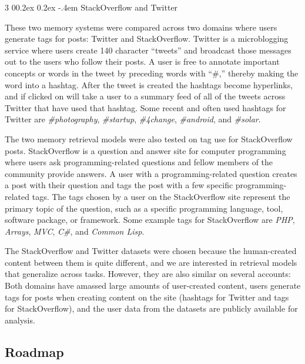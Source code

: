 \documentclass[man,donotrepeattitle]{apa6}
\makeatletter
\renewcommand{\subsubsection}{%
  \@startsection
  {subsubsection}%
  {3}%
  {\parindent}%
  {0\baselineskip \@plus 0.2ex \@minus 0.2ex}%
  {-.4em}%
  {\normalfont\normalsize\bfseries\addperi}}
\makeatother
\begin{document}
\subsubsection{StackOverflow and Twitter}

These two memory systems were compared across two domains where users generate tags for posts: Twitter and StackOverflow.
Twitter is a microblogging service where users create 140 character ``tweets'' and broadcast those messages out to the users who follow their posts.
A user is free to annotate important concepts or words in the tweet by preceding words with ``\#,'' thereby making the word into a hashtag.
After the tweet is created the hashtags become hyperlinks, and if clicked on will take a user to a summary feed of all of the tweets across Twitter that have used that hashtag.
Some recent and often used hashtags for Twitter are \emph{\#photography}, \emph{\#startup}, \emph{\#4change}, \emph{\#android}, and \emph{\#solar}.

The two memory retrieval models were also tested on tag use for StackOverflow posts.
StackOverflow is a question and answer site for computer programming where users ask programming-related questions and fellow members of the community provide answers.
A user with a programming-related question creates a post with their question and tags the post with a few specific programming-related tags. 
The tags chosen by a user on the StackOverflow site represent the primary topic of the question, such as a specific programming language, tool, software package, or framework.
Some example tags for StackOverflow are \emph{PHP}, \emph{Arrays}, \emph{MVC}, \emph{C\#}, and \emph{Common Lisp}.

The StackOverflow and Twitter datasets were chosen because the human-created content between them is quite different, and we are interested in retrieval models that generalize across tasks.
However, they are also similar on several accounts:
Both domains have amassed large amounts of user-created content, users generate tags for posts when creating content on the site (hashtags for Twitter and tags for StackOverflow),
and the user data from the datasets are publicly available for analysis.

\subsection{Roadmap}
\end{document}
